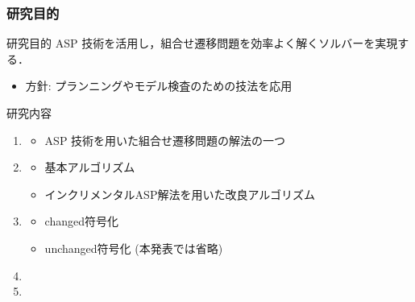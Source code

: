 \documentclass[dvipdfmx,11pt]{beamer}
\begin{document}
\begin{frame}
  \frametitle{研究目的}
  \begin{alertblock}{研究目的}
    ASP 技術を活用し，組合せ遷移問題を効率よく解くソルバーを実現する．
  \end{alertblock}
  \begin{itemize}
  \item 方針: プランニングやモデル検査のための技法を応用
  \end{itemize}
  \begin{block}{研究内容}
    \begin{enumerate}
    \item {}
      \begin{itemize}
      \item ASP 技術を用いた組合せ遷移問題の解法の一つ
      \end{itemize}
    \item {}
      \begin{itemize}
      \item 基本アルゴリズム
      \item インクリメンタルASP解法を用いた改良アルゴリズム
      \end{itemize}
    \item {}
      \begin{itemize}
      \item \textsf{changed}符号化
      \item \textsf{unchanged}符号化 (本発表では省略)
      \end{itemize}
    \item {}
    \item {}
    \end{enumerate}
  \end{block}
\end{frame}
\end{document}

